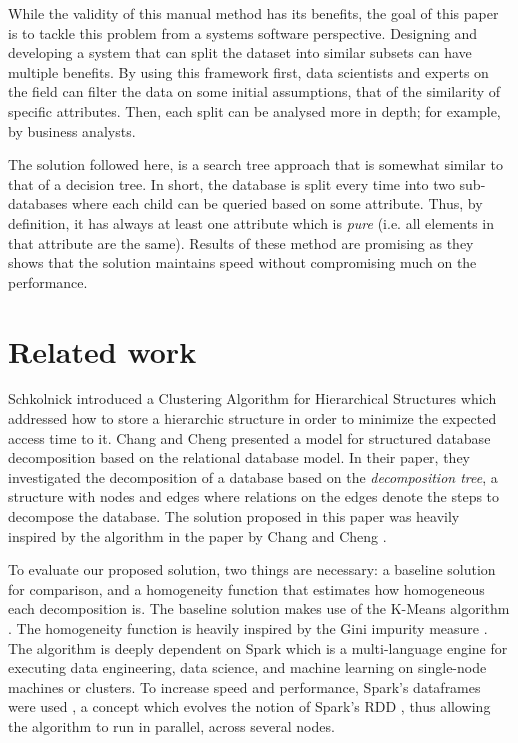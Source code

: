\documentclass[sigconf]{acmart}
\begin{document}
While the validity of this manual method has its benefits, the goal of this paper is to tackle this problem from a systems software perspective. Designing and developing a system that can split the dataset into similar subsets can have multiple benefits. By using this framework first, data scientists and experts on the field can filter the data on some initial assumptions, that of the similarity of specific attributes. Then, each split can be analysed more in depth; for example, by business analysts.

The solution followed here, is a search tree approach that is somewhat similar to that of a decision tree. In short, the database is split every time into two sub-databases where each child can be queried based on some attribute. Thus, by definition, it has always at least one attribute which is \textit{pure} (i.e. all elements in that attribute are the same). Results of these method are promising as they shows that the solution maintains speed without compromising much on the performance.

\section{Related work}
Schkolnick \cite{hsiao1977clustering} introduced a Clustering Algorithm for Hierarchical Structures which addressed how to store a hierarchic structure in order to minimize the expected access time to it. Chang and Cheng \cite{ChangCheng} presented a model for structured database decomposition based on the relational database model. In their paper, they investigated the decomposition of a database based on the \textit{decomposition tree}, a structure with nodes and edges where relations on the edges denote the steps to decompose the database. The solution proposed in this paper was heavily inspired by the algorithm in the paper by Chang and Cheng \cite{ChangCheng}.

To evaluate our proposed solution, two things are necessary: a baseline solution for comparison, and a homogeneity function that estimates how homogeneous each decomposition is. The baseline solution makes use of the K-Means algorithm \cite{lloyd1982least}. The homogeneity function is heavily inspired by the Gini impurity measure \cite{Grabmeier-2007}. The algorithm is deeply dependent on Spark \cite{spark2018apache} which is a multi-language engine for executing data engineering, data science, and machine learning on single-node machines or clusters. To increase speed and performance, Spark's dataframes were used \cite{armbrust2015spark}, a concept which evolves the notion of Spark's RDD \cite{zaharia2012resilient}, thus allowing the algorithm to run in parallel, across several nodes.
\end{document}
